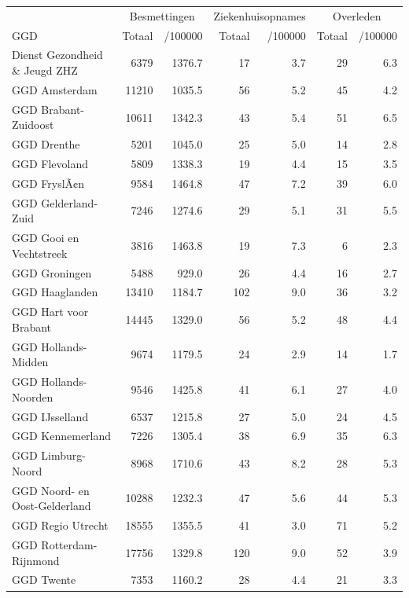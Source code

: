 \documentclass[
  english,
  man,floatsintext]{apa6}
\begin{document}
\begin{table}
\centering\begingroup\fontsize{10}{12}\selectfont

\begin{threeparttable}
\begin{tabular}{lrrrrrr}
\toprule
\multicolumn{1}{c}{ } & \multicolumn{2}{c}{Besmettingen} & \multicolumn{2}{c}{Ziekenhuisopnames} & \multicolumn{2}{c}{Overleden} \\
\cmidrule(l{3pt}r{3pt}){2-3} \cmidrule(l{3pt}r{3pt}){4-5} \cmidrule(l{3pt}r{3pt}){6-7}
GGD & Totaal & /100000 & Totaal & /100000 & Totaal & /100000\\
\midrule
Dienst Gezondheid \& Jeugd ZHZ & 6379 & 1376.7 & 17 & 3.7 & 29 & 6.3\\
GGD Amsterdam & 11210 & 1035.5 & 56 & 5.2 & 45 & 4.2\\
GGD Brabant-Zuidoost & 10611 & 1342.3 & 43 & 5.4 & 51 & 6.5\\
GGD Drenthe & 5201 & 1045.0 & 25 & 5.0 & 14 & 2.8\\
GGD Flevoland & 5809 & 1338.3 & 19 & 4.4 & 15 & 3.5\\
GGD FryslÃ¢n & 9584 & 1464.8 & 47 & 7.2 & 39 & 6.0\\
GGD Gelderland-Zuid & 7246 & 1274.6 & 29 & 5.1 & 31 & 5.5\\
GGD Gooi en Vechtstreek & 3816 & 1463.8 & 19 & 7.3 & 6 & 2.3\\
GGD Groningen & 5488 & 929.0 & 26 & 4.4 & 16 & 2.7\\
GGD Haaglanden & 13410 & 1184.7 & 102 & 9.0 & 36 & 3.2\\
GGD Hart voor Brabant & 14445 & 1329.0 & 56 & 5.2 & 48 & 4.4\\
GGD Hollands-Midden & 9674 & 1179.5 & 24 & 2.9 & 14 & 1.7\\
GGD Hollands-Noorden & 9546 & 1425.8 & 41 & 6.1 & 27 & 4.0\\
GGD IJsselland & 6537 & 1215.8 & 27 & 5.0 & 24 & 4.5\\
GGD Kennemerland & 7226 & 1305.4 & 38 & 6.9 & 35 & 6.3\\
GGD Limburg-Noord & 8968 & 1710.6 & 43 & 8.2 & 28 & 5.3\\
GGD Noord- en Oost-Gelderland & 10288 & 1232.3 & 47 & 5.6 & 44 & 5.3\\
GGD Regio Utrecht & 18555 & 1355.5 & 41 & 3.0 & 71 & 5.2\\
GGD Rotterdam-Rijnmond & 17756 & 1329.8 & 120 & 9.0 & 52 & 3.9\\
GGD Twente & 7353 & 1160.2 & 28 & 4.4 & 21 & 3.3\\

\end{tabular}
\end{threeparttable}
\end{table}
\end{document}
